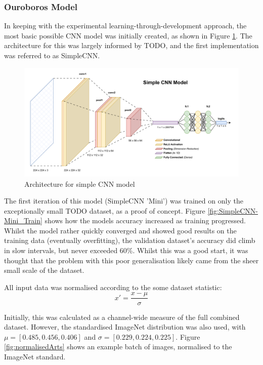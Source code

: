             \subsubsection{Ouroboros Model}
    
                In keeping with the experimental learning-through-development approach, the most basic possible CNN model was initially created, as shown in Figure \ref{fig:BabyOuroboros}. The architecture for this was largely informed by TODO, and the first implementation was referred to as SimpleCNN.
    
                \begin{figure}[htbp]
                    \centering
                    \includegraphics[width=\linewidth]{images/BabyOuroboros.pdf}
                    \caption{Architecture for simple CNN model}
                    \label{fig:BabyOuroboros}
                \end{figure}
    
                The first iteration of this model (SimpleCNN 'Mini') was trained on only the exceptionally small TODO dataset, as a proof of concept. Figure \ref{fig:SimpleCNN-Mini_Train} shows how the models accuracy increased as training progressed. Whilst the model rather quickly converged and showed good results on the training data (eventually overfitting), the validation dataset's accuracy did climb in slow intervals, but never exceeded 60\%. Whilst this was a good start, it was thought that the problem with this poor generalisation likely came from the sheer small scale of the dataset.
    
                All input data was normalised according to the some dataset statistic:
                    \[
                    x' = \frac{x - \mu}{\sigma}
                    \]
    
                Initially, this was calculated as a channel-wide measure of the full combined dataset. However, the standardised ImageNet distribution was also used, with \( \mu = [0.485, 0.456, 0.406] \) and \( \sigma = [0.229, 0.224, 0.225] \). Figure \ref{fig:normalisedArts} shows an example batch of images, normalised to the ImageNet standard.
        
